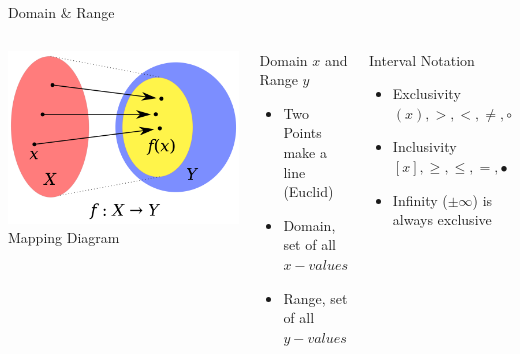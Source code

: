 \documentclass[14pt,aspectratio=169]{beamer}
\begin{document}
\begin{frame}{Domain \& Range}
  \begin{columns}
   \centering
    \includegraphics[width=1\textwidth]{image04}\\Mapping Diagram
    \begin{block}{Domain $x$ and Range $y$} \centering
      \begin{itemize}
       \item Two Points make a line (Euclid)
       \item Domain, set of all $x-values$
       \item Range, set of all $y-values$
      \end{itemize}
    \end{block}

    \begin{block}{Interval Notation}
     \begin{itemize}
      \item Exclusivity $(x), >, <, \neq, \circ$
      \item Inclusivity $[x], \geq, \leq, =, \bullet$
      \item Infinity ($\pm\infty$) is always exclusive
     \end{itemize}

    \end{block}

  \end{columns}

\end{frame}
\end{document}
